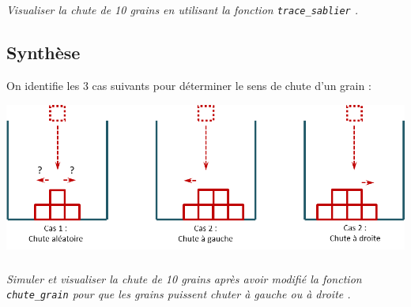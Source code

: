 \subparagraph{}\textit{Visualiser la chute de 10 grains en utilisant la fonction \texttt{trace\_sablier} . }


\subsection*{Synthèse}


On identifie les 3 cas suivants pour déterminer le sens de chute d'un grain :
\begin{center}
\includegraphics[width=\linewidth]{images/sablier_03}
\end{center}

\subparagraph{}\textit{Simuler et visualiser la chute de 10 grains après avoir modifié la fonction \texttt{chute\_grain} pour que les grains puissent chuter à gauche ou à droite . }


